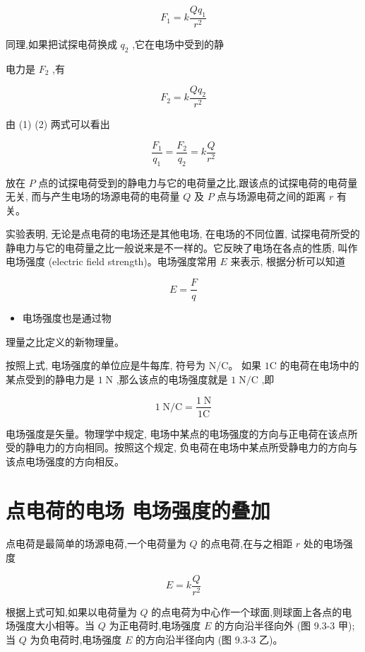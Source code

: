 \documentclass[10pt]{article}
\begin{document}
\[
{F}_{1} = k\frac{Q{q}_{1}}{{r}^{2}} \tag{1}
\]

同理,如果把试探电荷换成 \({q}_{2}\) ,它在电场中受到的静

电力是 \({F}_{2}\) ,有

\[
{F}_{2} = k\frac{Q{q}_{2}}{{r}^{2}} \tag{（2）}
\]

由 (1) (2) 两式可以看出

\[
\frac{{F}_{1}}{{q}_{1}} = \frac{{F}_{2}}{{q}_{2}} = k\frac{Q}{{r}^{2}}
\]

放在 \(P\) 点的试探电荷受到的静电力与它的电荷量之比,跟该点的试探电荷的电荷量无关, 而与产生电场的场源电荷的电荷量 \(Q\) 及 \(P\) 点与场源电荷之间的距离 \(r\) 有关。

实验表明, 无论是点电荷的电场还是其他电场, 在电场的不同位置, 试探电荷所受的静电力与它的电荷量之比一般说来是不一样的。它反映了电场在各点的性质, 叫作电场强度 (electric field strength)。电场强度常用 \(E\) 来表示, 根据分析可以知道

\[
E = \frac{F}{q}
\]

\begin{mdframed}

\begin{itemize}
\item 电场强度也是通过物
\end{itemize}

理量之比定义的新物理量。

\end{mdframed}

按照上式, 电场强度的单位应是牛每库, 符号为 N/C。 如果 \(1\mathrm{C}\) 的电荷在电场中的某点受到的静电力是 \(1\mathrm{\;N}\) ,那么该点的电场强度就是 \(1\mathrm{\;N}/\mathrm{C}\) ,即

\[
1\mathrm{\;N}/\mathrm{C} = \frac{1\mathrm{\;N}}{1\mathrm{C}}
\]

电场强度是矢量。物理学中规定, 电场中某点的电场强度的方向与正电荷在该点所受的静电力的方向相同。按照这个规定, 负电荷在电场中某点所受静电力的方向与该点电场强度的方向相反。

\section*{点电荷的电场 电场强度的叠加}

点电荷是最简单的场源电荷,一个电荷量为 \(Q\) 的点电荷,在与之相距 \(r\) 处的电场强度

\[
E = k\frac{Q}{{r}^{2}}
\]

根据上式可知,如果以电荷量为 \(Q\) 的点电荷为中心作一个球面,则球面上各点的电场强度大小相等。当 \(Q\) 为正电荷时,电场强度 \(E\) 的方向沿半径向外 (图 9.3-3 甲); 当 \(Q\) 为负电荷时,电场强度 \(E\) 的方向沿半径向内 (图 9.3-3 乙)。
\end{document}
